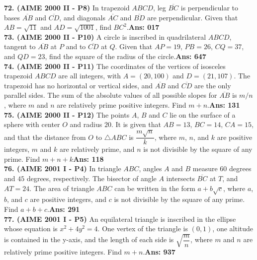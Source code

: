 \documentclass[letterpaper,10pt,addpoints]{exam}
\begin{document}
\textbf{72. (AIME 2000 II - P8) }In trapezoid $ABCD$, leg $\overline{BC}$ is perpendicular to bases $\overline{AB}$ and $\overline{CD}$, and diagonals $\overline{AC}$ and $\overline{BD}$ are perpendicular. Given that $AB=\sqrt{11}$ and $AD=\sqrt{1001}$, find $BC^2$.\quad\textbf{Ans: 017}\\

\textbf{73. (AIME 2000 II - P10) }A circle is inscribed in quadrilateral $ABCD$, tangent to $\overline{AB}$ at $P$ and to $\overline{CD}$ at $Q$. Given that $AP=19$, $PB=26$, $CQ=37$, and $QD=23$, find the square of the radius of the circle.\quad\textbf{Ans: 647}\\

\textbf{74. (AIME 2000 II - P11) }The coordinates of the vertices of isosceles trapezoid $ABCD$ are all integers, with $A=(20,100)$ and $D=(21,107)$. The trapezoid has no horizontal or vertical sides, and $\overline{AB}$ and $\overline{CD}$ are the only parallel sides. The sum of the absolute values of all possible slopes for $\overline{AB}$ is $m/n$, where $m$ and $n$ are relatively prime positive integers. Find $m+n$.\quad\textbf{Ans: 131}\\

\textbf{75. (AIME 2000 II - P12) }The points $A$, $B$ and $C$ lie on the surface of a sphere with center $O$ and radius $20$. It is given that $AB=13$, $BC=14$, $CA=15$, and that the distance from $O$ to $\triangle ABC$ is $\dfrac{m\sqrt{n}}k$, where $m$, $n$, and $k$ are positive integers, $m$ and $k$ are relatively prime, and $n$ is not divisible by the square of any prime. Find $m+n+k$\quad\textbf{Ans: 118}\\

\textbf{76. (AIME 2001 I - P4) }In triangle $ABC$, angles $A$ and $B$ measure $60$ degrees and $45$ degrees, respectively. The bisector of angle $A$ intersects $\overline{BC}$ at $T$, and $AT=24$. The area of triangle $ABC$ can be written in the form $a+b\sqrt{c}$, where $a$, $b$, and $c$ are positive integers, and $c$ is not divisible by the square of any prime. Find $a+b+c$.\quad\textbf{Ans: 291}\\

\textbf{77. (AIME 2001 I - P5) }An equilateral triangle is inscribed in the ellipse whose equation is $x^2+4y^2=4$. One vertex of the triangle is $(0,1)$, one altitude is contained in the y-axis, and the length of each side is $\sqrt{\dfrac mn}$, where $m$ and $n$ are relatively prime positive integers. Find $m+n$.\quad\textbf{Ans: 937}\\
\end{document}
